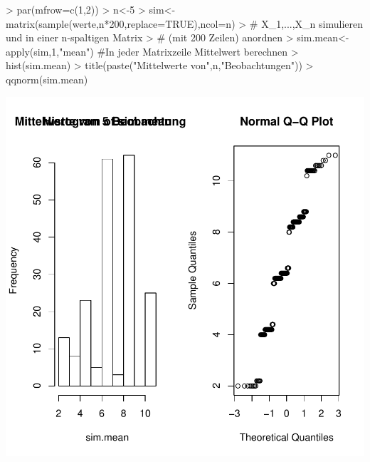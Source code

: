 \begin{Schunk}
\begin{Sinput}
> par(mfrow=c(1,2))
> n<-5
> sim<-matrix(sample(werte,n*200,replace=TRUE),ncol=n)
> # X_1,...,X_n simulieren und in einer n-spaltigen Matrix
> # (mit 200 Zeilen) anordnen
> sim.mean<- apply(sim,1,"mean") #In jeder Matrixzeile Mittelwert berechnen
> hist(sim.mean)
> title(paste("Mittelwerte von",n,"Beobachtungen"))
> qqnorm(sim.mean)
\end{Sinput}
\end{Schunk}
\includegraphics{sw08_4-004}

